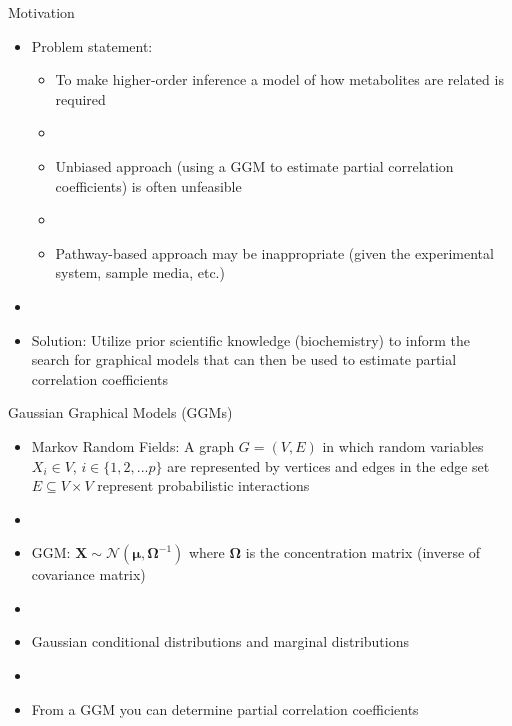 \documentclass[xcolor=dvipsnames]{beamer}
\begin{document}
\begin{frame}{Motivation}
	\vspace{-15.5pt}
	\begin{itemize}
		\item Problem statement: \pause
		\begin{itemize}
			\item To make higher-order inference a model of how metabolites are related is required \pause
			\item[]
			\item Unbiased approach (using a GGM to estimate partial correlation coefficients) is often unfeasible \pause
			\item[]
			\item Pathway-based approach may be inappropriate (given the experimental system, sample media, etc.) \pause
		\end{itemize}
		\item[]
		\item Solution: Utilize prior scientific knowledge (biochemistry) to inform the search for graphical models that can then be used to estimate partial correlation coefficients
	\end{itemize}
\end{frame}

\begin{frame}{Gaussian Graphical Models (GGMs)}
	\vspace{-5.5pt}
	\begin{itemize}
		\item Markov Random Fields: A graph $G=(V,E)$ in which random variables $X_i\in V$, $i\in \{1,2,...p\}$ are represented by vertices and edges in the edge set $E \subseteq V \times V$ represent probabilistic interactions \pause
		\item[]
		\item GGM: $\textbf{X}\sim \mathcal{N}(\boldsymbol{\mu},\boldsymbol{\Omega}^{-1})$ where $\boldsymbol{\Omega}$ is the concentration matrix (inverse of covariance matrix) \pause
		\item[]
		\item Gaussian conditional distributions and marginal distributions \pause
		\item[]
		\item From a GGM you can determine partial correlation coefficients 
	\end{itemize}
\end{frame}
\end{document}

